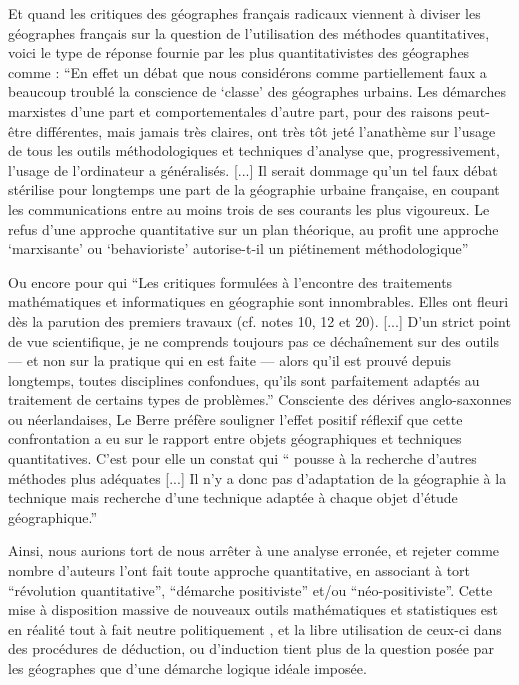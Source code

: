 Et quand les critiques des géographes français radicaux viennent à diviser les géographes français sur la question de l'utilisation des méthodes quantitatives, voici le type de réponse fournie par les plus quantitativistes des géographes comme \textcite[337-338]{Pumain1983} : \enquote{En effet un débat que nous considérons comme partiellement faux a beaucoup troublé la conscience de \enquote{classe} des géographes urbains. Les démarches marxistes d'une part et comportementales d'autre part, pour des raisons peut-être différentes, mais jamais très claires, ont très tôt jeté l'anathème sur l'usage de tous les outils méthodologiques et techniques d'analyse que, progressivement, l'usage de l'ordinateur a généralisés. [...] Il serait dommage qu'un tel faux débat stérilise pour longtemps une part de la géographie urbaine française, en coupant les communications entre au moins trois de ses courants les plus vigoureux. Le refus d'une approche quantitative sur un plan théorique, au profit une approche \enquote{marxisante} ou \enquote{behavioriste} autorise-t-il un piétinement méthodologique}

Ou encore \textcite[11]{LeBerre1987} pour qui \enquote{Les critiques formulées à l'encontre des traitements mathématiques et informatiques en géographie sont innombrables. Elles ont fleuri dès la parution des premiers travaux (cf. notes 10, 12 et 20). [...] D'un strict point de vue scientifique, je ne comprends toujours pas ce déchaînement sur des outils — et non sur la pratique qui en est faite — alors qu'il est prouvé depuis longtemps, toutes disciplines confondues, qu'ils sont parfaitement adaptés au traitement de certains types de problèmes.} Consciente des dérives anglo-saxonnes ou néerlandaises, Le Berre préfère souligner l'effet positif réflexif que cette confrontation a eu sur le rapport entre objets géographiques et techniques quantitatives. C'est pour elle un constat qui \enquote{ pousse à la recherche d’autres méthodes plus adéquates [...] Il n’y a donc pas d’adaptation de la géographie à la technique mais recherche d'une technique adaptée à chaque objet d'étude géographique.}

Ainsi, nous aurions tort de nous arrêter à une analyse erronée, et rejeter comme nombre d'auteurs l'ont fait toute approche quantitative, en associant à tort \enquote{révolution quantitative}, \enquote{démarche positiviste} et/ou \enquote{néo-positiviste}. Cette mise à disposition massive de nouveaux outils mathématiques et statistiques est en réalité tout à fait neutre politiquement \autocite{Sheppard2001}, et la libre utilisation de ceux-ci dans des procédures de déduction, ou d'induction tient plus de la question posée par les géographes que d'une démarche logique idéale imposée. \autocite{Sanders2000}

